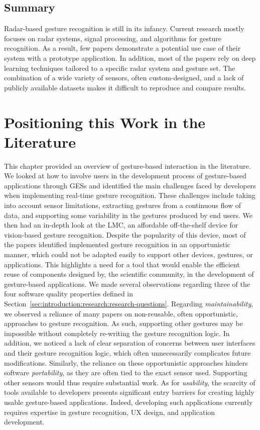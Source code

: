 \subsection{Summary} \label{sec:state_of_the_art:radar:summary}
Radar-based gesture recognition is still in its infancy. Current research mostly focuses on radar systems, signal processing, and algorithms for gesture recognition. As a result, few papers demonstrate a potential use case of their system with a prototype application.
%
In addition, most of the papers rely on deep learning techniques tailored to a specific radar system and gesture set. The combination of a wide variety of sensors, often custom-designed, and a lack of publicly available datasets makes it difficult to reproduce and compare results.

\section{Positioning this Work in the Literature} \label{sec:state_of_the_art:this_work}
This chapter provided an overview of gesture-based interaction in the literature. We looked at how to involve users in the development process of gesture-based applications through GESs and identified the main challenges faced by developers when implementing real-time gesture recognition. These challenges include taking into account sensor limitations, extracting gestures from a continuous flow of data, and supporting some variability in the gestures produced by end users.
%
We then had an in-depth look at the LMC, an affordable off-the-shelf device for vision-based gesture recognition. Despite the popularity of this device, most of the papers identified implemented gesture recognition in an opportunistic manner, which could not be adapted easily to support other devices, gestures, or applications. This highlights a need for a tool that would enable the efficient reuse of components designed by, \eg the scientific community, in the development of gesture-based applications.
%
We made several observations regarding three of the four software quality properties defined in Section~\ref{sec:introduction:research:research-questions}.
%
Regarding \textit{maintainability}, we observed a reliance of many papers on non-reusable, often opportunistic, approaches to gesture recognition. As such, supporting other gestures may be impossible without completely re-writing the gesture recognition logic. In addition, we noticed a lack of clear separation of concerns between user interfaces and their gesture recognition logic, which often unnecessarily complicates future modifications.
%
Similarly, the reliance on these opportunistic approaches hinders software \textit{portability}, as they are often tied to the exact sensor used. Supporting other sensors would thus require substantial work. 
%
As for \textit{usability}, the scarcity of tools available to developers presents significant entry barriers for creating highly usable gesture-based applications. Indeed, developing such applications currently requires expertise in gesture recognition, UX design, and application development.

